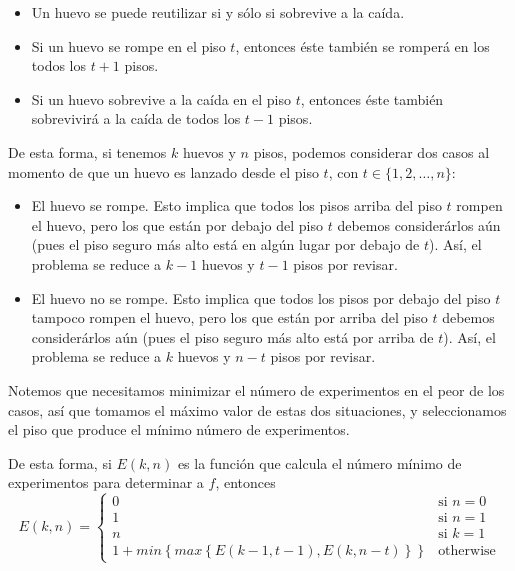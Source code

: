 \documentclass[letterpaper,11pt]{article}
\begin{document}
\begin{enumerate}
\begin{enumerate}
\begin{itemize}
            \item Un huevo se puede reutilizar si y sólo si sobrevive a 
            la caída. 

            \item Si un huevo se rompe en el piso $t$, entonces éste también 
            se romperá en los todos los $t+1$ pisos.

            \item Si un huevo sobrevive a la caída en el piso $t$, entonces 
            éste también sobrevivirá a la caída de todos los $t-1$ pisos.
        \end{itemize}

        De esta forma, si tenemos $k$ huevos y $n$ pisos, podemos considerar 
        dos casos al momento de que un huevo es lanzado desde el piso $t$, 
        con $t \in \{1, 2, \ldots, n\}$:
        \begin{itemize}
            \item El huevo se rompe. Esto implica que todos los pisos arriba 
            del piso $t$ rompen el huevo, pero los que están por debajo del 
            piso $t$ debemos considerárlos aún (pues el piso seguro más alto 
            está en algún lugar por debajo de $t$). Así, el problema se reduce 
            a $k-1$ huevos y $t-1$ pisos por revisar.

            \item El huevo no se rompe. Esto implica que todos los pisos 
            por debajo del piso $t$ tampoco rompen el huevo, pero los que están 
            por arriba del piso $t$ debemos considerárlos aún (pues el piso 
            seguro más alto está por arriba de $t$). Así, el problema se  
            reduce a $k$ huevos y $n-t$ pisos por revisar. 
        \end{itemize}

        Notemos que necesitamos minimizar el número de experimentos en el peor 
        de los casos, así que tomamos el máximo valor de estas dos situaciones, 
        y seleccionamos el piso que produce el mínimo número de experimentos.

        De esta forma, si $E(k,n)$ es la función que calcula el número mínimo 
        de experimentos para determinar a $f$, entonces 
        \begin{equation*}
            E(k, n) = 
            \begin{cases}
                0 & \text{si $n =0$} \\
                1 & \text{si $n = 1$} \\
                n & \text{si $k = 1$} \\
                1 + min\left\{max\left\{E(k-1, t-1), E(k, n-t)\right\}\right\} & 
                \text{otherwise}
            \end{cases}
        \end{equation*}
    \end{enumerate}


\end{enumerate}
\end{document}
